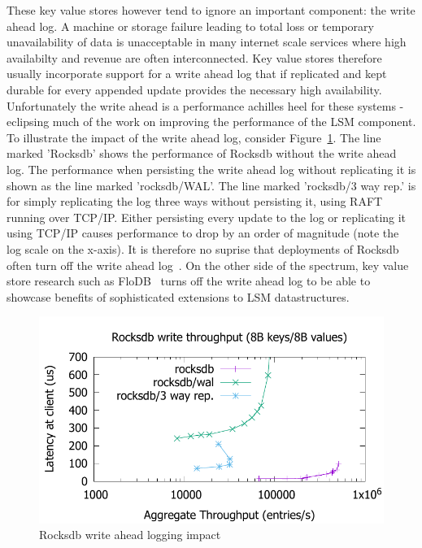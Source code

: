 \documentclass[10pt, preprint, nonatbib]{sigplanconf}
\begin{document}
These key value stores however tend to ignore an important component: the write
ahead log. A machine or storage failure leading to total loss or temporary
unavailability of data is unacceptable in many internet scale services where
high availabilty and revenue are often interconnected. Key value stores
therefore usually incorporate support for a write ahead log that if replicated
and kept durable for every appended update provides the necessary high
availability. Unfortunately the write ahead is a performance achilles heel for
these systems - eclipsing much of the work on improving the performance of the LSM
component. To illustrate the impact of the write ahead log, consider
Figure~\ref{fig:problem}. The line marked 'Rocksdb' shows the performance of
Rocksdb without the write ahead log. The performance when persisting the write
ahead log without replicating it is shown as the line marked 'rocksdb/WAL'. The
line marked 'rocksdb/3 way rep.' is for simply replicating the log three ways
without persisting it, using RAFT~\cite{raft} running over TCP/IP. Either
persisting every update to the log or replicating it using TCP/IP causes
performance to drop by an order of magnitude (note the log scale on the
x-axis). It is therefore no suprise that deployments of Rocksdb often turn off
the write ahead log~\cite{samza}. On the other side of the spectrum, key value
store research such as FloDB~\cite{flodb} turns off the write ahead log to be
able to showcase benefits of sophisticated extensions to LSM datastructures.

\begin{figure}
\centering
\includegraphics[scale=0.6]{results2/problem.pdf}
\caption{Rocksdb write ahead logging impact}
\label{fig:problem}
\end{figure}
\end{document}
